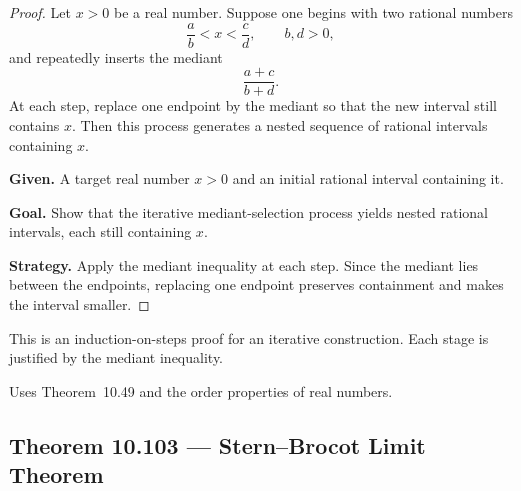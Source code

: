 \begin{proof}
\Claim Let $x>0$ be a real number.  Suppose one begins with two rational numbers
\[
\frac{a}{b} < x < \frac{c}{d}, \qquad b,d>0,
\]
and repeatedly inserts the mediant
\[
\frac{a+c}{b+d}.
\]
At each step, replace one endpoint by the mediant so that the new interval still contains $x$.  Then this process generates a nested sequence of rational intervals containing $x$.

\textbf{Given.} A target real number $x>0$ and an initial rational interval containing it.

\textbf{Goal.} Show that the iterative mediant-selection process yields nested rational intervals, each still containing $x$.

\textbf{Strategy.} Apply the mediant inequality at each step.  Since the mediant lies between the endpoints, replacing one endpoint preserves containment and makes the interval smaller.


\end{proof}

\begin{remark*}
This is an induction-on-steps proof for an iterative construction.
Each stage is justified by the mediant inequality.
\end{remark*}

\begin{remark*}[Dependencies]
Uses Theorem~10.49 and the order properties of real numbers.
\end{remark*}


\subsection*{Theorem 10.103 — Stern--Brocot Limit Theorem}
\label{prf:grep-stern-brocot-limit-theorem}

